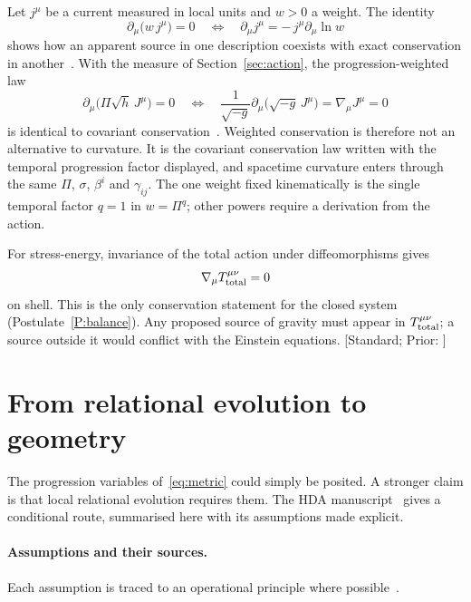 \documentclass[11pt]{article}
\newcommand{\Pg}{\Pi}                 %
\newcommand{\sgP}{\sigma}             %
\newcommand{\st}[1]{\textsf{\small[#1]}}
\theoremstyle{plain}
\theoremstyle{definition}
\theoremstyle{remark}
\begin{document}
Let $j^\mu$ be a current measured in local units and $w>0$ a weight. The identity
\begin{equation}
\partial_\mu\big(w\,j^\mu\big)=0 \quad\Longleftrightarrow\quad \partial_\mu j^\mu = -\,j^\mu\partial_\mu\ln w
\end{equation}
shows how an apparent source in one description coexists with exact conservation in another~\cite{JordanDirection}. With the measure of Section~\ref{sec:action}, the progression-weighted law
\begin{equation}
\partial_\mu\big(\Pg\sqrt h\,J^\mu\big)=0
\quad\Longleftrightarrow\quad
\frac{1}{\sqrt{-g}}\partial_\mu\big(\sqrt{-g}\,J^\mu\big)=\nabla_\mu J^\mu=0
\label{eq:weighted}
\end{equation}
is identical to covariant conservation~\cite{JordanHDA,JordanGeometry}. Weighted conservation is therefore not an alternative to curvature. It is the covariant conservation law written with the temporal progression factor displayed, and spacetime curvature enters through the same $\Pg$, $\sgP$, $\beta^i$ and $\gamma_{ij}$. The one weight fixed kinematically is the single temporal factor $q=1$ in $w=\Pg^q$; other powers require a derivation from the action.

For stress-energy, invariance of the total action under diffeomorphisms gives
\begin{equation}
\nabla_\mu T^{\mu\nu}_{\rm total}=0
\end{equation}
on shell. This is the only conservation statement for the closed system (Postulate~\ref{P:balance}). Any proposed source of gravity must appear in $T^{\mu\nu}_{\rm total}$; a source outside it would conflict with the Einstein equations. \st{Standard; Prior: \cite{JordanHDA,JordanLoading}}

\section{From relational evolution to geometry}
\label{sec:HDA}

The progression variables of~\eqref{eq:metric} could simply be posited. A stronger claim is that local relational evolution requires them. The HDA manuscript~\cite{JordanHDA} gives a conditional route, summarised here with its assumptions made explicit.

\paragraph{Assumptions and their sources.}
Each assumption is traced to an operational principle where possible~\cite{JordanNote2}.
\end{document}

